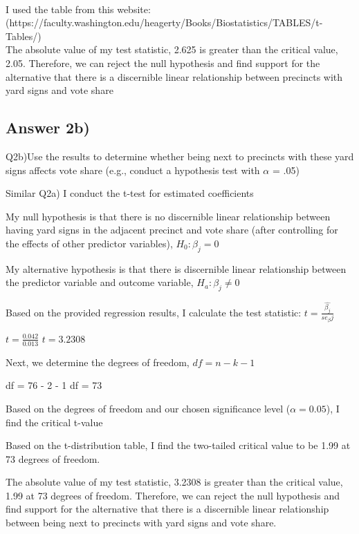 \documentclass{article}
\begin{document}
\\
I used the table from this website: 
(https://faculty.washington.edu/heagerty/Books/Biostatistics/TABLES/t-Tables/)
\\
The absolute value of my test statistic, 2.625 is greater than the 
critical value, 2.05. Therefore, we can reject the null hypothesis and 
find support for the alternative that there is a discernible linear 
relationship between precincts with yard signs and vote share
\\

\subsection{Answer 2b)}
Q2b)Use the results to determine whether being next to precincts with these yard signs affects vote share (e.g., conduct a hypothesis test with $\alpha$ = .05)

Similar Q2a) I conduct the t-test for estimated coefficients

\noindent My null hypothesis is that there is no discernible linear relationship between having yard signs in the adjacent precinct and vote share (after controlling for the effects of other predictor variables), $H_0: \beta_j = 0$ 

\noindent My alternative hypothesis is that there is discernible linear relationship between the predictor variable and outcome variable, $H_a: 
\beta_j \neq 0 $

Based on the provided regression results, I calculate the test statistic:
$t = \frac{\hat{\beta_j}}{se_\beta j}$

$t= \frac{0.042}{0.013}$
$t = 3.2308$

Next, we determine the degrees of freedom,
$df = n - k - 1$

df = 76 - 2 - 1
df = 73

Based on the degrees of freedom and our chosen significance level ($\alpha=0.05$), I find the critical t-value

Based on the t-distribution table, I find the two-tailed critical value to be 1.99 at 73 degrees of freedom.

The absolute value of my test statistic, 3.2308 is greater than the 
critical value, 1.99 at 73 degrees of freedom. Therefore, we can reject the null hypothesis and find support for the alternative that there is a discernible linear relationship between being next to precincts with yard signs and vote share. 
\end{document}
